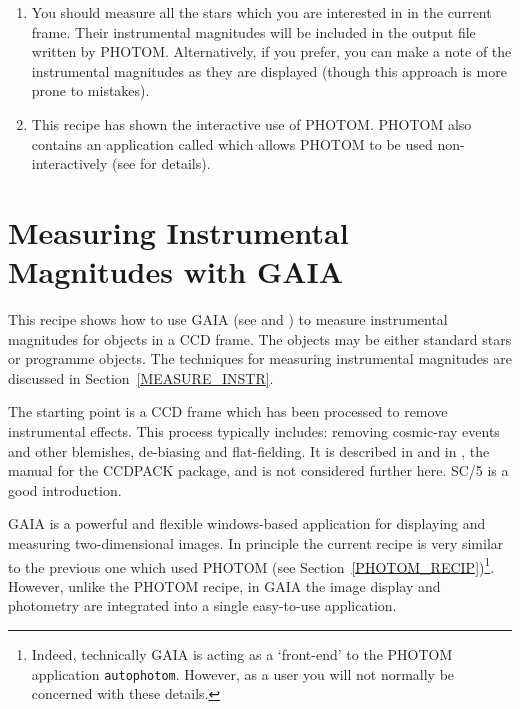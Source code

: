 \documentclass[twoside,11pt,nolof]{starlink}
\begin{document}
\begin{enumerate}
  \item You should measure all the stars which you are interested in in the
   current frame.  Their instrumental magnitudes will be included in the
   output file written by PHOTOM.  Alternatively, if you prefer, you can
   make a note of the instrumental magnitudes as they are displayed
   (though this approach is more prone to mistakes).

  \newpage
  \item This recipe has shown the interactive use of PHOTOM.  PHOTOM also
   contains an application called 
   which allows PHOTOM to be used non-interactively (see
   \cite{SUN45} for details).

\end{enumerate}


\newpage
\section{\label{GAIA_RECIP}Measuring Instrumental
Magnitudes with GAIA}

This recipe shows how to use GAIA (see \cite{SC17}
and \cite{SUN214}) to measure instrumental
magnitudes for objects in a CCD frame.  The objects may be either
standard stars or programme objects.  The techniques for measuring
instrumental magnitudes are discussed in Section~\ref{MEASURE_INSTR}.

The starting point is a CCD frame which has been processed to remove
instrumental effects.  This process typically includes: removing
cosmic-ray events and other blemishes, de-biasing and flat-fielding.  It
is described in \/\cite{SC5} and in \cite{SUN139},
the manual for the CCDPACK package, and is not considered further here.
SC/5 is a good introduction.

GAIA is a powerful and flexible windows-based application for
displaying and measuring two-dimensional images.  In principle the
current recipe is very similar to the previous one which used PHOTOM (see
Section~\ref{PHOTOM_RECIP})\footnote{Indeed, technically GAIA is acting
as a `front-end' to the PHOTOM application \texttt{autophotom}.  However, as
a user you will not normally be concerned with these details.}.
However, unlike the PHOTOM recipe, in GAIA the image display and
photometry are integrated into a single easy-to-use application.
\end{document}
